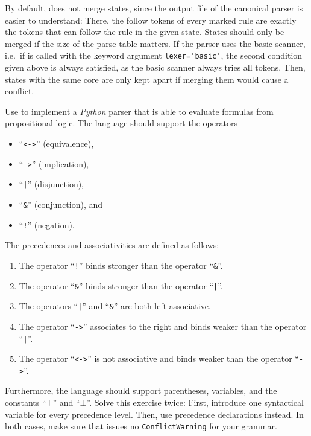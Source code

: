 \remarkEng
By default,  does not merge states, since the output file of the canonical parser is easier
to understand:  There, the follow tokens of every marked rule are exactly the tokens that can follow the rule
in the given state.  States should only be merged if the size of the parse table matters.  If the parser uses
the basic scanner, i.e.~if  is called with the keyword argument \texttt{lexer='basic'}, the
second condition given above is always satisfied, as the basic scanner always tries all tokens.  Then, states
with the same core are only kept apart if merging them would cause a conflict.
\eox

\exerciseEng
Use  to implement a \textsl{Python} parser that is able to evaluate formulas from propositional logic.
The language should support the operators
\begin{itemize}
\item ``\texttt{<->}'' (equivalence), 
\item ``\texttt{->}'' (implication),
\item ``\texttt{|}'' (disjunction), 
\item ``\texttt{\&}'' (conjunction), and 
\item ``\texttt{!}'' (negation).
\end{itemize}
The precedences and associativities are defined as follows:
\begin{enumerate}
\item The operator ``\texttt{!}''  binds stronger than the operator ``\texttt{\&}''.
\item The operator ``\texttt{\&}'' binds stronger than the operator ``\texttt{|}''.  
\item The operators ``\texttt{|}'' and ``\texttt{\&}'' are both left associative.  
\item The operator ``\texttt{->}'' associates to the right and binds weaker than the operator ``\texttt{|}''. 
\item The operator ``\texttt{<->}'' is not associative and binds weaker than the operator ``\texttt{->}''.
\end{enumerate}
Furthermore, the language should support parentheses, variables, and the constants ``$\top$'' and ``$\bot$''.
Solve this exercise twice:  First, introduce one syntactical variable for every precedence level.  Then, use
precedence declarations instead.  In both cases, make sure that  issues no
\texttt{ConflictWarning} for your grammar.

